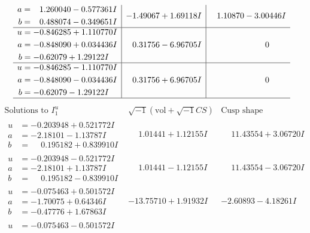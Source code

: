 \documentclass[1p]{elsarticle_modified}
\theoremstyle{definition}
\newcommand{\I}{\sqrt{-1}}
\begin{document}
$$\begin{array}{c|c|c}
\begin{aligned}
a &= \phantom{-}1.260040 - 0.577361 I \\
b &= \phantom{-}0.488074 - 0.349651 I\end{aligned}
 & -1.49067 + 1.69118 I & \phantom{-}1.10870 - 3.00446 I \\ \hline\begin{aligned}
u &= -0.846285 + 1.110770 I \\
a &= -0.848090 + 0.034436 I \\
b &= -0.62079 + 1.29122 I\end{aligned}
 & \phantom{-}0.31756 - 6.96705 I & \phantom{-0.000000 } 0 \\ \hline\begin{aligned}
u &= -0.846285 - 1.110770 I \\
a &= -0.848090 - 0.034436 I \\
b &= -0.62079 - 1.29122 I\end{aligned}
 & \phantom{-}0.31756 + 6.96705 I & \phantom{-0.000000 } 0\\
 \hline 
 \end{array}$$\newpage$$\begin{array}{c|c|c}  
\text{Solutions to }I^u_{1}& \I (\text{vol} + \sqrt{-1}CS) & \text{Cusp shape}\\
 \hline 
\begin{aligned}
u &= -0.203948 + 0.521772 I \\
a &= -2.18101 - 1.13787 I \\
b &= \phantom{-}0.195182 + 0.839910 I\end{aligned}
 & \phantom{-}1.01441 + 1.12155 I & \phantom{-}11.43554 + 3.06720 I \\ \hline\begin{aligned}
u &= -0.203948 - 0.521772 I \\
a &= -2.18101 + 1.13787 I \\
b &= \phantom{-}0.195182 - 0.839910 I\end{aligned}
 & \phantom{-}1.01441 - 1.12155 I & \phantom{-}11.43554 - 3.06720 I \\ \hline\begin{aligned}
u &= -0.075463 + 0.501572 I \\
a &= -1.70075 + 0.64346 I \\
b &= -0.47776 + 1.67863 I\end{aligned}
 & -13.75710 + 1.91932 I & -2.60893 - 4.18261 I \\ \hline\begin{aligned}
u &= -0.075463 - 0.501572 I \\

\end{aligned}
\end{array}$$
\end{document}
